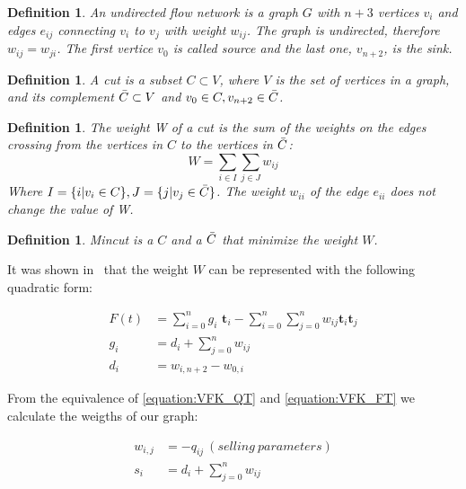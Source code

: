 \documentclass{amsart}
\newtheorem{definition}[theorem]{Definition}
\numberwithin{equation}{section}
\begin{document}
{\begin{definition}
An undirected flow network is a graph $G$ with $n+3$ vertices $v_i$ and edges $e_{ij}$ connecting $v_i$ to $v_j$ with weight $w_{ij}$. The graph is undirected, therefore $w_{ij}=w_{ji}$. The first vertice $v_0$ is called source and the last one, $v_{n+2}$, is the sink.
\end{definition}

\begin{definition}
A cut is a subset $C \subset V$, where $V$ is the set of vertices in a graph, and its complement $\Bar{C} \subset V$ and $v_0 \in C, v_{n+2} \in \Bar{C}$.
\end{definition}

\begin{definition}
The weight W of a cut is the sum of the weights on the edges crossing from the vertices in $C$ to the vertices in $\Bar{C}$:
$$W = \sum_{i \in I} \sum_{j \in J} w_{ij}$$
Where $I=\{ i | v_i \in C\}, J=\{ j | v_j \in \Bar{C}\}$. The weight $w_{ii}$ of the edge $e_{ii}$ does not change the value of W.
\end{definition}

\begin{definition}
Mincut is a $C$ and a $\Bar{C}$ that minimize the weight $W$.
\end{definition}

It was shown in~\cite{VFK-CVP} that the weight $W$ can be represented with the following quadratic form:

\begin{equation}
\begin{split}
F(t) & = \sum_{i=0}^{n}g_i\textbf{ t}_i - \sum_{i=0}^{n}\sum_{j=0}^{n}w_{ij}\textbf{t}_i\textbf{t}_j \\
g_i & = d_i + \sum_{j=0}^{n}w_{ij} \\
d_i & = w_{i,n+2} - w_{0,i}
\end{split}
\label{equation:VFK_FT}
\end{equation}

From the equivalence of \eqref{equation:VFK_QT} and \eqref{equation:VFK_FT} we calculate the weigths of our graph:

\begin{equation}
\begin{split}
w_{i,j} & = -q_{ij} \ (selling \ parameters) \\
s_i & = d_i + \sum_{j=0}^{n} w_{ij}
\end{split}
\label{equation:VFK_S}
\end{equation}

}
\end{document}
